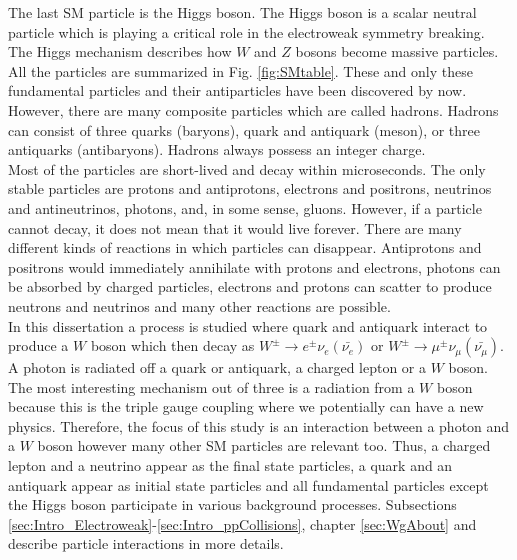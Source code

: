 The last SM particle is the Higgs boson. The Higgs boson is a scalar neutral particle which is playing a critical role in the electroweak symmetry breaking. The Higgs mechanism describes how $W$ and $Z$ bosons become massive particles.\\

All the particles are summarized in Fig. \ref{fig:SMtable}. These and only these fundamental particles and their antiparticles have been discovered by now. However, there are many composite particles which are called hadrons. Hadrons can consist of three quarks (baryons), quark and antiquark (meson), or three antiquarks (antibaryons). Hadrons always possess an integer charge.\\

Most of the particles are short-lived and decay within microseconds. The only stable particles are protons and antiprotons, electrons and positrons, neutrinos and antineutrinos, photons, and, in some sense, gluons. However, if a particle cannot decay, it does not mean that it would live forever. There are many different kinds of reactions in which particles can disappear. Antiprotons and positrons would immediately annihilate with protons and electrons, photons can be absorbed by charged particles, electrons and protons can scatter to produce neutrons and neutrinos and many other reactions are possible.\\ 

In this dissertation a process is studied where quark and antiquark interact to produce a $W$ boson which then decay as $W^\pm \rightarrow e^\pm \nu_e(\bar{\nu_e})$ or $W^\pm \rightarrow \mu^\pm \nu_\mu(\bar{\nu_\mu}) $. A photon is radiated off a quark or antiquark, a charged lepton or a $W$ boson. The most interesting mechanism out of three is a radiation from a $W$ boson because this is the triple gauge coupling where we potentially can have a new physics. Therefore, the focus of this study is an interaction between a photon and a $W$ boson however many other SM particles are relevant too. Thus, a charged lepton and a neutrino appear as the final state particles, a quark and an antiquark appear as initial state particles and all fundamental particles except the Higgs boson participate in various background processes. Subsections \ref{sec:Intro_Electroweak}-\ref{sec:Intro_ppCollisions}, chapter \ref{sec:WgAbout} and \cite{ref_Griffiths} describe particle interactions in more details.\\


